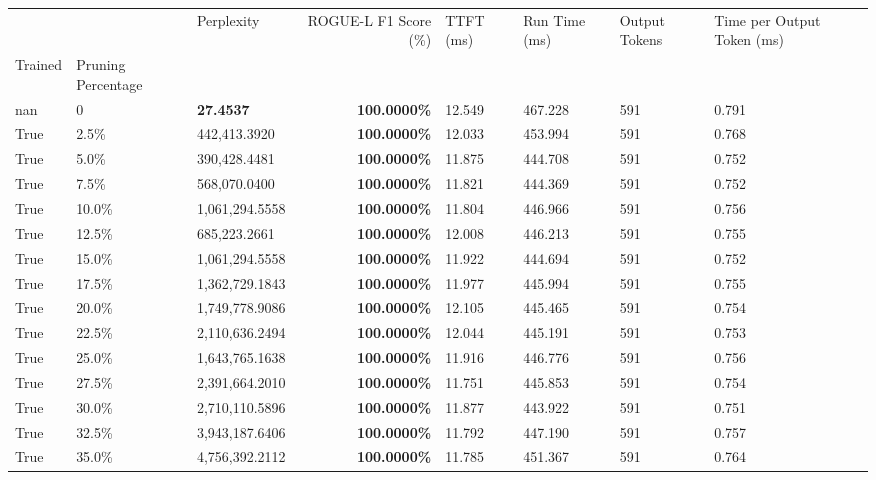 \begin{table}[H]
\label{tab:evaluation-pipeline-4-trained}
\begin{tabular}{lllrllll}
\toprule
 &  & Perplexity & ROGUE-L F1 Score (\%) & TTFT (ms) & Run Time (ms) & Output Tokens & Time per Output Token (ms) \\
Trained & Pruning Percentage &  &  &  &  &  &  \\
\midrule
nan & 0 & \bfseries 27.4537 & \bfseries 100.0000\% & 12.549 & 467.228 & 591 & 0.791 \\
\cline{1-8}
True & 2.5\% & 442,413.3920 & \bfseries \color{red} 100.0000\% & 12.033 & 453.994 & 591 & 0.768 \\
\cline{1-8}
True & 5.0\% & 390,428.4481 & \bfseries \color{red} 100.0000\% & 11.875 & 444.708 & 591 & 0.752 \\
\cline{1-8}
True & 7.5\% & 568,070.0400 & \bfseries \color{red} 100.0000\% & 11.821 & 444.369 & 591 & 0.752 \\
\cline{1-8}
True & 10.0\% & 1,061,294.5558 & \bfseries \color{red} 100.0000\% & 11.804 & 446.966 & 591 & 0.756 \\
\cline{1-8}
True & 12.5\% & 685,223.2661 & \bfseries \color{red} 100.0000\% & 12.008 & 446.213 & 591 & 0.755 \\
\cline{1-8}
True & 15.0\% & 1,061,294.5558 & \bfseries \color{red} 100.0000\% & 11.922 & 444.694 & 591 & 0.752 \\
\cline{1-8}
True & 17.5\% & 1,362,729.1843 & \bfseries \color{red} 100.0000\% & 11.977 & 445.994 & 591 & 0.755 \\
\cline{1-8}
True & 20.0\% & 1,749,778.9086 & \bfseries \color{red} 100.0000\% & 12.105 & 445.465 & 591 & 0.754 \\
\cline{1-8}
True & 22.5\% & 2,110,636.2494 & \bfseries \color{red} 100.0000\% & 12.044 & 445.191 & 591 & 0.753 \\
\cline{1-8}
True & 25.0\% & 1,643,765.1638 & \bfseries \color{red} 100.0000\% & 11.916 & 446.776 & 591 & 0.756 \\
\cline{1-8}
True & 27.5\% & 2,391,664.2010 & \bfseries \color{red} 100.0000\% & 11.751 & 445.853 & 591 & 0.754 \\
\cline{1-8}
True & 30.0\% & 2,710,110.5896 & \bfseries \color{red} 100.0000\% & 11.877 & 443.922 & 591 & 0.751 \\
\cline{1-8}
True & 32.5\% & 3,943,187.6406 & \bfseries \color{red} 100.0000\% & 11.792 & 447.190 & 591 & 0.757 \\
\cline{1-8}
True & 35.0\% & 4,756,392.2112 & \bfseries \color{red} 100.0000\% & 11.785 & 451.367 & 591 & 0.764 \\

\end{tabular}
\end{table}
